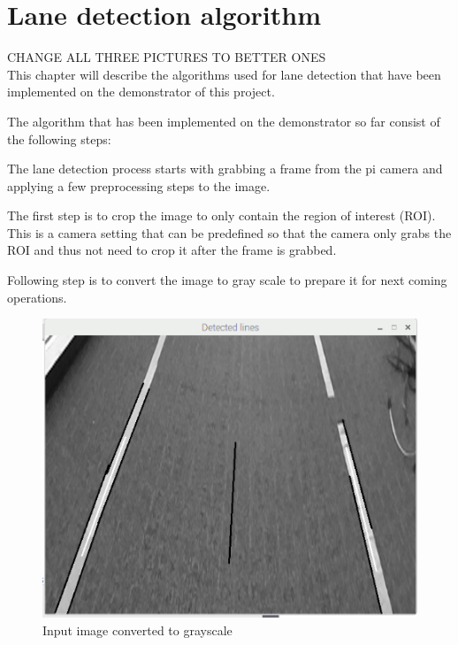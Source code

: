 

\section{Lane detection algorithm}
CHANGE ALL THREE PICTURES TO BETTER ONES\\

This chapter will describe the algorithms used for lane detection that have been implemented on the demonstrator of this project. 

The algorithm that has been implemented on the demonstrator so far consist of the following steps:

The lane detection process starts with grabbing a frame from the pi camera and applying a few preprocessing steps to the image. 

The first step is to crop the image to only contain the region of interest (ROI). This is a camera setting that can be predefined so that the camera only grabs the ROI and thus not need to crop it after the frame is grabbed.


Following step is to convert the image to gray scale to prepare it for next coming operations. 



\begin{figure}[H]
  \includegraphics[width=\textwidth]{./img/gray.png}
  \centering
  \caption{Input image converted to grayscale}
  \label{fig:Input image converted to grayscale}
\end{figure}


